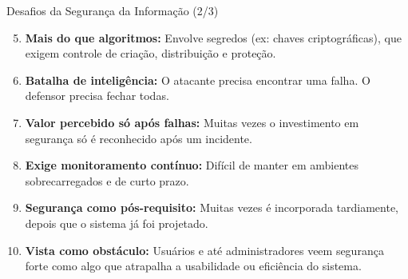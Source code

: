 \begin{frame}{Desafios da Segurança da Informação (2/3)}

\begin{enumerate}
  \setcounter{enumi}{4}
  \item \textbf{Mais do que algoritmos:} Envolve segredos (ex: chaves criptográficas), que exigem controle de criação, distribuição e proteção.

  \item \textbf{Batalha de inteligência:} O atacante precisa encontrar uma falha. O defensor precisa fechar todas.

  \item \textbf{Valor percebido só após falhas:} Muitas vezes o investimento em segurança só é reconhecido após um incidente.

  \item \textbf{Exige monitoramento contínuo:} Difícil de manter em ambientes sobrecarregados e de curto prazo.
\end{enumerate}

\begin{enumerate}
  \setcounter{enumi}{8}
  \item \textbf{Segurança como pós-requisito:} Muitas vezes é incorporada tardiamente, depois que o sistema já foi projetado.

  \item \textbf{Vista como obstáculo:} Usuários e até administradores veem segurança forte como algo que atrapalha a usabilidade ou eficiência do sistema.
\end{enumerate}

\end{frame}

